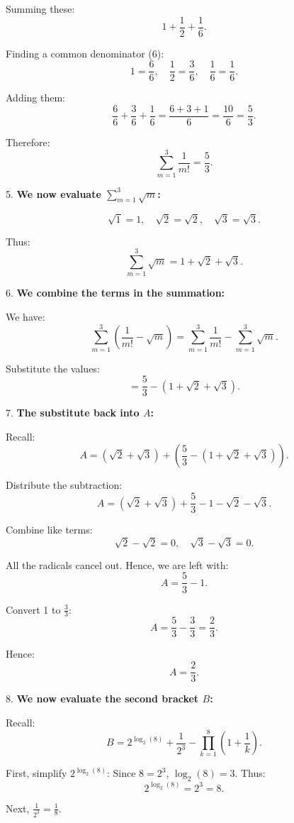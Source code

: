 \documentclass[12pt,a4paper]{article}
\begin{document}
   Summing these:
   \[
   1 + \frac{1}{2} + \frac{1}{6}.
   \]

   Finding a common denominator (6):
   \[
   1 = \frac{6}{6}, \quad \frac{1}{2} = \frac{3}{6}, \quad \frac{1}{6}=\frac{1}{6}.
   \]

   Adding them:
   \[
   \frac{6}{6} + \frac{3}{6} + \frac{1}{6} = \frac{6+3+1}{6} = \frac{10}{6} = \frac{5}{3}.
   \]

   Therefore:
   \[
   \sum_{m=1}^{3}\frac{1}{m!} = \frac{5}{3}.
   \]

5. \textbf{We now evaluate \(\sum_{m=1}^{3}\sqrt{m}\):}

   \[
   \sqrt{1} = 1, \quad \sqrt{2}=\sqrt{2},\quad \sqrt{3}=\sqrt{3}.
   \]

   Thus:
   \[
   \sum_{m=1}^{3}\sqrt{m} = 1 + \sqrt{2} + \sqrt{3}.
   \]

6. \textbf{We combine the terms in the summation:}

   We have:
   \[
   \sum_{m=1}^{3}\left(\frac{1}{m!} - \sqrt{m}\right) = \sum_{m=1}^{3}\frac{1}{m!} - \sum_{m=1}^{3}\sqrt{m}.
   \]

   Substitute the values:
   \[
   = \frac{5}{3} - (1 + \sqrt{2} + \sqrt{3}).
   \]

7. \textbf{The substitute back into \(A\):}

   Recall:
   \[
   A = (\sqrt{2} + \sqrt{3}) + \left(\frac{5}{3} - (1 + \sqrt{2} + \sqrt{3})\right).
   \]

   Distribute the subtraction:
   \[
   A = (\sqrt{2} + \sqrt{3}) + \frac{5}{3} - 1 - \sqrt{2} - \sqrt{3}.
   \]

   Combine like terms:
   \[
   \sqrt{2} - \sqrt{2} = 0, \quad \sqrt{3} - \sqrt{3} = 0.
   \]

   All the radicals cancel out. Hence, we are left with:
   \[
   A = \frac{5}{3} - 1.
   \]

   Convert 1 to \(\frac{3}{3}\):
   \[
   A = \frac{5}{3} - \frac{3}{3} = \frac{2}{3}.
   \]

   Hence:
   \[
   A = \frac{2}{3}.
   \]

8. \textbf{We now evaluate the second bracket \(B\):}

   Recall:
   \[
   B = 2^{\log_2(8)} + \frac{1}{2^3} - \prod_{k=1}^{8}\left(1 + \frac{1}{k}\right).
   \]

   First, simplify \(2^{\log_2(8)}\):
   Since \(8=2^3\), \(\log_2(8)=3\). Thus:
   \[
   2^{\log_2(8)} = 2^3 = 8.
   \]

   Next, \(\frac{1}{2^3} = \frac{1}{8}\).
\end{document}
